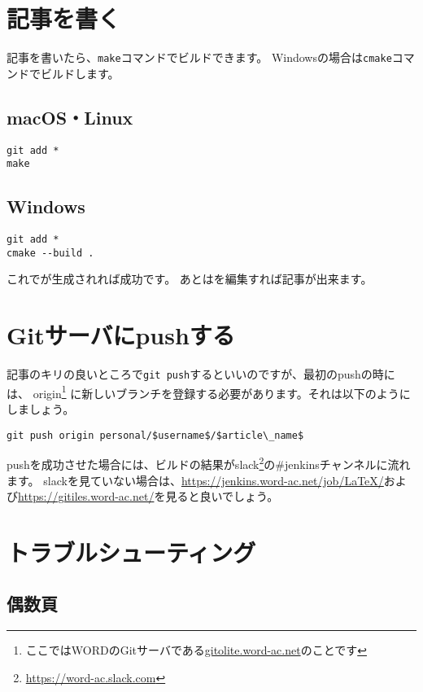 \documentclass{word}
\begin{document}
\section{記事を書く}

記事を書いたら、\lstinline|make|コマンドでビルドできます。
Windowsの場合は\lstinline|cmake|コマンドでビルドします。

\subsection{macOS・Linux}

\begin{lstlisting}
git add *
make
\end{lstlisting}

\subsection{Windows}

\begin{lstlisting}
git add *
cmake --build .
\end{lstlisting}

これでが生成されれば成功です。
あとはを編集すれば記事が出来ます。

\section{Gitサーバにpushする}

記事のキリの良いところで\lstinline|git push|するといいのですが、最初のpushの時には、
origin\footnote{ここではWORDのGitサーバである\url{gitolite.word-ac.net}のことです}%
に新しいブランチを登録する必要があります。それは以下のようにしましょう。

\begin{lstlisting}[mathescape]
git push origin personal/$username$/$article\_name$
\end{lstlisting}

pushを成功させた場合には、ビルドの結果がslack\footnote{\url{https://word-ac.slack.com}}の\#jenkinsチャンネルに流れます。
slackを見ていない場合は、\url{https://jenkins.word-ac.net/job/LaTeX/}および\url{https://gitiles.word-ac.net/}を見ると良いでしょう。

\section{トラブルシューティング}

\subsection{偶数頁}
\end{document}
